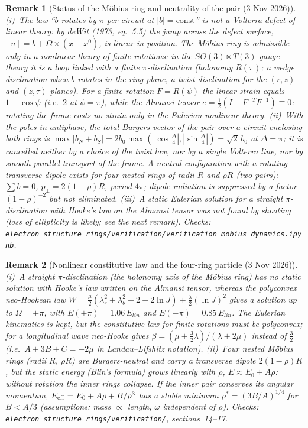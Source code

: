 \documentclass[12pt,a4paper]{article}
\newtheorem{remark}{Remark}
\begin{document}
\begin{remark}[Status of the M\"obius ring and neutrality of the pair (3 Nov 2026)]
\label{rem:mobius_status}
(i)~The law ``$b$ rotates by $\pi$ per circuit at $|b|=\mathrm{const}$'' is \emph{not} a Volterra
defect of linear theory: by deWit (1973, eq.~5.5) the jump across the defect surface,
$[u]=b+\Omega\times(x-x^0)$, is linear in position. The M\"obius ring is admissible only in a nonlinear
theory of finite rotations: in the $SO(3)\ltimes T(3)$ gauge theory it is a loop linked with a finite
$\pi$-disclination (holonomy $R(\pi)$; a wedge disclination when $b$ rotates in the ring plane, a twist
disclination for the $(r,z)$ and $(z,\tau)$ planes). For a finite rotation $F=R(\psi)$ the linear strain
equals $1-\cos\psi$ (i.e.~$2$ at $\psi=\pi$), while the Almansi tensor $e=\tfrac12(I-F^{-T}F^{-1})\equiv0$:
rotating the frame costs no strain only in the Eulerian nonlinear theory.
(ii)~With the poles in antiphase, the total Burgers vector of the pair over a circuit enclosing both
rings is $\max|b_N+b_S|=2b_0\max(|\cos\tfrac{\Delta}{4}|,|\sin\tfrac{\Delta}{4}|)=\sqrt2\,b_0$ at
$\Delta=\pi$; it is cancelled neither by a choice of the twist law, nor by a single Volterra line, nor by
smooth parallel transport of the frame. A neutral configuration with a rotating transverse dipole exists
for four nested rings of radii $R$ and $\rho R$ (two pairs): $\sum b=0$, $p_\perp=2(1-\rho)R$, period
$4\pi$; dipole radiation is suppressed by a factor $(1-\rho)^{-2}$ but not eliminated.
(iii)~A static Eulerian solution for a straight $\pi$-disclination with Hooke's law on the Almansi
tensor was not found by shooting (loss of ellipticity is likely; see the next remark).
Checks: \texttt{electron\_structure\_rings/verification/verification\_mobius\_dynamics.ipynb}.
\end{remark}

\begin{remark}[Nonlinear constitutive law and the four-ring particle (3 Nov 2026)]
(i)~A straight $\pi$-disclination (the holonomy axis of the M\"obius ring) has no static solution
with Hooke's law written on the Almansi tensor, whereas the polyconvex neo-Hookean law
$W=\tfrac\mu2(\lambda_r^2+\lambda_\theta^2-2-2\ln J)+\tfrac\lambda2(\ln J)^2$ gives a solution up to
$\Omega=\pm\pi$, with $E(+\pi)=1.06\,E_{lin}$ and $E(-\pi)=0.85\,E_{lin}$. The Eulerian kinematics
is kept, but the constitutive law for finite rotations must be polyconvex; for a longitudinal wave
neo-Hooke gives $\beta=(\mu+\tfrac32\lambda)/(\lambda+2\mu)$ instead of $\tfrac32$
(i.e.\ $A+3B+C=-2\mu$ in Landau--Lifshitz notation).
(ii)~Four nested M\"obius rings (radii $R$, $\rho R$) are Burgers-neutral and carry a transverse
dipole $2(1-\rho)R$, but the static energy (Blin's formula) grows linearly with $\rho$,
$E\approx E_0+A\rho$: without rotation the inner rings collapse. If the inner pair conserves its
angular momentum, $E_{\rm eff}=E_0+A\rho+B/\rho^3$ has a stable minimum $\rho^*=(3B/A)^{1/4}$ for
$B<A/3$ (assumptions: mass $\propto$ length, $\omega$ independent of $\rho$).
Checks: \texttt{electron\_structure\_rings/verification/}, sections~14--17.
\end{remark}
\end{document}
